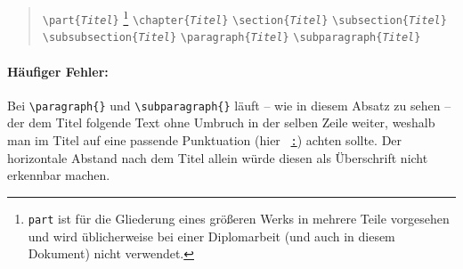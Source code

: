 %
\begin{quote}
\verb!\part{!\texttt{\em Titel}\verb!}!%
\footnote{\texttt{part} ist für die Gliederung eines
größeren Werks in mehrere Teile vorgesehen und wird üblicherweise
bei einer Diplomarbeit (und auch in diesem Dokument) nicht
verwendet.}
\newline%
\verb!\chapter{!\texttt{\em Titel}\verb!}! \newline%
\verb!\section{!\texttt{\em Titel}\verb!}! \newline%
\verb!\subsection{!\texttt{\em Titel}\verb!}! \newline%
\verb!\subsubsection{!\texttt{\em Titel}\verb!}! \newline%
\verb!\paragraph{!\texttt{\em Titel}\verb!}! \newline%
\verb!\subparagraph{!\texttt{\em Titel}\verb!}!
\end{quote}
%

\paragraph{Häufiger Fehler:} Bei \verb!\paragraph{}! und
\verb!\subparagraph{}! läuft -- wie in diesem Absatz zu sehen --
der dem Titel folgende Text ohne Umbruch in der selben Zeile
weiter, weshalb man im Titel auf eine passende Punktuation (hier
\zB\ \underline{\texttt{:}}) achten sollte. Der horizontale Abstand
nach dem Titel allein würde diesen als Überschrift nicht erkennbar
machen.


